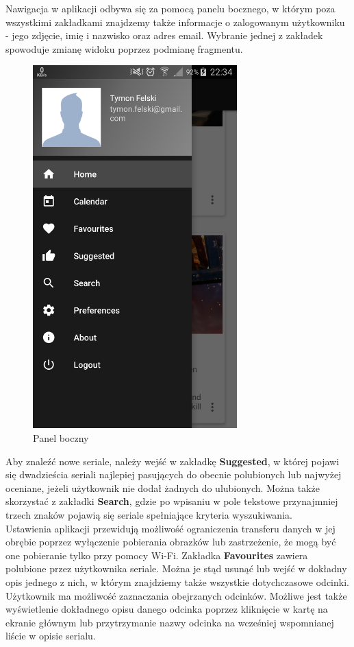 \documentclass[10pt,a4paper]{article}
\begin{document}
\newpage
\noindent
Nawigacja w aplikacji odbywa się za pomocą panelu bocznego, w którym poza wszystkimi zakładkami znajdzemy także informacje o zalogowanym użytkowniku - jego zdjęcie, imię i nazwisko oraz adres email. Wybranie jednej z zakładek spowoduje zmianę widoku poprzez podmianę fragmentu.
\begin{figure}[H]
	\centering
	\includegraphics[height=14cm]{Resources/Images/drawer.png}
	\caption{Panel boczny}
\end{figure}
\noindent
Aby znaleźć nowe seriale, należy wejść w zakładkę \textbf{Suggested}, w której pojawi się dwadzieścia seriali najlepiej pasujących do obecnie polubionych lub najwyżej oceniane, jeżeli użytkownik nie dodał żadnych do ulubionych. Można także skorzystać z zakładki \textbf{Search}, gdzie po wpisaniu w pole tekstowe przynajmniej trzech znaków pojawią się seriale spełniające kryteria wyszukiwania.\\[\baselineskip]
Ustawienia aplikacji przewidują możliwość ograniczenia transferu danych w jej obrębie poprzez wyłączenie pobierania obrazków lub zastrzeżenie, że mogą być one pobieranie tylko przy pomocy Wi-Fi.
\newpage
\noindent
Zakładka \textbf{Favourites} zawiera polubione przez użytkownika seriale. Można je stąd usunąć lub wejść w dokładny opis jednego z nich, w którym znajdziemy także wszystkie dotychczasowe odcinki. Użytkownik ma możliwość zaznaczania obejrzanych odcinków. Możliwe jest także wyświetlenie dokładnego opisu danego odcinka poprzez kliknięcie w kartę na ekranie głównym lub przytrzymanie nazwy odcinka na wcześniej wspomnianej liście w opisie serialu.
\end{document}
